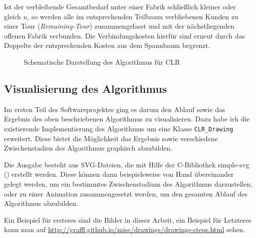 \documentclass[a4paper,ngerman,11pt,bibtotoc]{scrartcl}
\theoremstyle{definition}
\theoremstyle{plain}
\theoremstyle{remark}
\def\Cpp{{C\nolinebreak[4]\hspace{-.05em}\raisebox{.4ex}{\tiny\bf ++}}}
\begin{document}
\begin{description}
	Ist der verbleibende Gesamtbedarf unter einer Fabrik schließlich kleiner oder gleich $u$, so werden alle im entsprechenden Teilbaum verbliebenen Kunden zu einer Tour (\emph{Remaining-Tour}) zusammengefasst und mit der nächstliegenden offenen Fabrik verbunden. Die Verbindungskosten hierfür sind erneut durch das Doppelte der entsprechenden Kosten aus dem Spannbaum begrenzt.
\end{description}

\begin{figure}[H]
	\begin{tiny}
		
	\end{tiny}
	\caption{Schematische Darstellung des Algorithmus für CLR}\label{fig:CLRAlg}
\end{figure}

\subsection{Visualisierung des Algorithmus}

Im ersten Teil des Softwareprojektes ging es darum den Ablauf sowie das Ergebnis des oben beschriebenen Algorithmus zu visualisieren. Dazu habe ich die existierende Implementierung des Algorithmus um eine Klasse \lstinline|CLR_Drawing| erweitert. Diese bietet die Möglichkeit das Ergebnis sowie verschiedene Zwischenstadien des Algorithmus graphisch abzubilden. 

Die Ausgabe besteht aus SVG-Dateien, die mit Hilfe der \Cpp-Bibliothek simple-svg (\cite{simple-svg}) erstellt werden. Diese können dann beispielsweise von Hand übereinander gelegt werden, um ein bestimmtes Zwischenstadium des Algorithmus darzustellen, oder zu einer Animation zusammengesetzt werden, um den gesamten Ablauf des Algorithmus abzubilden.

Ein Beispiel für ersteres sind die Bilder in dieser Arbeit, ein Beispiel für Letzteres kann man auf \url{http://graffl.github.io/misc/drawings/drawings-steps.html} sehen.
\end{document}
